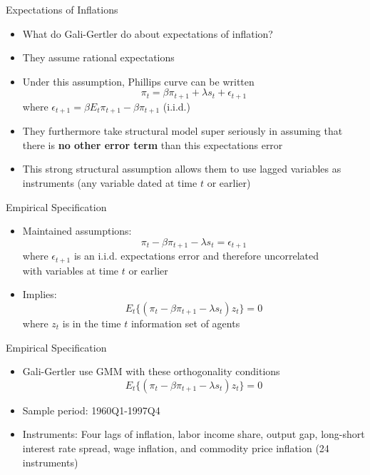 \documentclass[10pt]{beamer}
\begin{document}
\begin{frame}{Expectations of Inflations}
\begin{itemize}
\item What do Gali-Gertler do about expectations of inflation?
\item They assume rational expectations
\item Under this assumption, Phillips curve can be written
\[ \pi_{t} = \beta \pi_{t+1} + \lambda s_{t} + \epsilon_{t+1} \]
where $\epsilon_{t+1} = \beta E_{t} \pi_{t+1} - \beta \pi_{t+1}$ (i.i.d.)
\item They furthermore take structural model super seriously in assuming that there is \textbf{no other error term} than this expectations error
\item This strong structural assumption allows them to use lagged variables as instruments (any variable dated at time $t$ or earlier)
\end{itemize}
\end{frame}

\begin{frame}{Empirical Specification}
\begin{itemize}
\itemsep1em 
\item Maintained assumptions:
\[ \pi_{t} - \beta \pi_{t+1} - \lambda s_{t} = \epsilon_{t+1} \]
where $\epsilon_{t+1}$ is an i.i.d. expectations error and therefore uncorrelated \\ with variables at time $t$ or earlier
\item Implies:
\[ E_{t} \{ (\pi_{t} - \beta \pi_{t+1} - \lambda s_{t})z_{t} \} = 0 \]
where $z_{t}$ is in the time $t$ information set of agents
\end{itemize}
\end{frame}

\begin{frame}{Empirical Specification}

\begin{itemize}
\item Gali-Gertler use GMM with these orthogonality conditions
\[ E_{t} \{ (\pi_{t} - \beta \pi_{t+1} - \lambda s_{t})z_{t} \} = 0 \]
\item Sample period: 1960Q1-1997Q4
\item Instruments: Four lags of inflation, labor income share, output gap, long-short interest rate spread, wage inflation, and commodity price inflation (24 instruments)
\end{itemize}
\end{frame}
\end{document}
